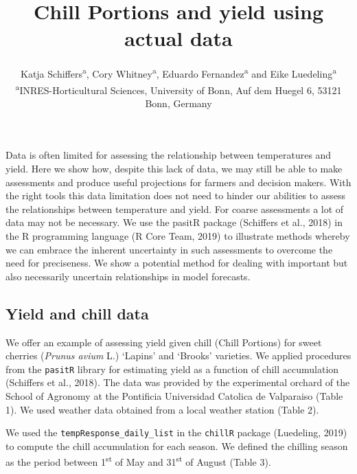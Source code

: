 \documentclass[]{article}
\title{Chill Portions and yield using actual data}
\author{Katja Schiffers\textsuperscript{a}, Cory Whitney\textsuperscript{a},
Eduardo Fernandez\textsuperscript{a} and Eike
Luedeling\textsuperscript{a} \textsuperscript{a}INRES-Horticultural
Sciences, University of Bonn, Auf dem Huegel 6, 53121 Bonn, Germany}
\date{}
\begin{document}
\maketitle

Data is often limited for assessing the relationship between
temperatures and yield. Here we show how, despite this lack of data, we
may still be able to make assessments and produce useful projections for
farmers and decision makers. With the right tools this data limitation
does not need to hinder our abilities to assess the relationships
between temperature and yield. For coarse assessments a lot of data may
not be necessary. We use the pasitR package (Schiffers et al., 2018) in
the R programming language (R Core Team, 2019) to illustrate methods
whereby we can embrace the inherent uncertainty in such assessments to
overcome the need for preciseness. We show a potential method for
dealing with important but also necessarily uncertain relationships in
model forecasts.

\hypertarget{yield-and-chill-data}{%
\subsection{Yield and chill data}\label{yield-and-chill-data}}

We offer an example of assessing yield given chill (Chill Portions) for
sweet cherries (\emph{Prunus avium} L.) `Lapins' and `Brooks' varieties.
We applied procedures from the \texttt{pasitR} library for estimating
yield as a function of chill accumulation (Schiffers et al., 2018). The
data was provided by the experimental orchard of the School of Agronomy
at the Pontificia Universidad Catolica de Valparaiso (Table 1). We used
weather data obtained from a local weather station (Table 2).

We used the \texttt{tempResponse\_daily\_list} in the \texttt{chillR}
package (Luedeling, 2019) to compute the chill accumulation for each
season. We defined the chilling season as the period between
1\textsuperscript{st} of May and 31\textsuperscript{st} of August (Table
3).
\end{document}
